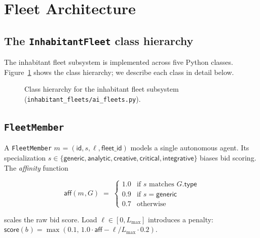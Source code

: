 \documentclass[11pt]{article}
\providecommand{\member}[1]{m_{#1}}                %
\providecommand{\bid}[1]{b_{#1}}                   %
\providecommand{\affinity}{\mathsf{aff}}           %
\providecommand{\load}{\ell}                       %
\providecommand{\maxload}{L_{\max}}                %
\providecommand{\score}{\mathsf{score}}            %
\providecommand{\FleetPY}{\texttt{InhabitantFleet}}
\providecommand{\CoordPY}{\texttt{FleetCoordinator}}
\providecommand{\MemberPY}{\texttt{FleetMember}}
\providecommand{\AggPY}{\texttt{BidAggregator}}
\begin{document}
\section{Fleet Architecture}\label{sec:fleet}

\subsection{The \FleetPY{} class hierarchy}

The inhabitant fleet subsystem is implemented across five Python classes.
Figure~\ref{fig:fleet-hierarchy} shows the class hierarchy; we describe each
class in detail below.

\begin{figure}[h]
\centering
{}
\caption{Class hierarchy for the inhabitant fleet subsystem
  (\texttt{inhabitant\_fleets/ai\_fleets.py}).}
\label{fig:fleet-hierarchy}
\end{figure}

\subsection{\MemberPY{}}\label{sec:fleet-member}

A \MemberPY{} $\member{} = (\mathsf{id}, s, \load, \mathsf{fleet\_id})$
models a single autonomous agent.  Its specialization $s \in \{\mathsf{generic},
\mathsf{analytic}, \mathsf{creative}, \mathsf{critical}, \mathsf{integrative}\}$
biases bid scoring.  The \emph{affinity} function

\[
  \affinity(\member{}, G)
  \;=\;
  \begin{cases}
    1.0 & \text{if } s \text{ matches } G.\mathsf{type} \\
    0.9 & \text{if } s = \mathsf{generic} \\
    0.7 & \text{otherwise}
  \end{cases}
\]

scales the raw bid score.  Load $\load \in [0, \maxload]$ introduces a
penalty: $\score(\bid{}) = \max(0.1,\, 1.0 \cdot \affinity - \load/\maxload \cdot 0.2)$.
\end{document}
